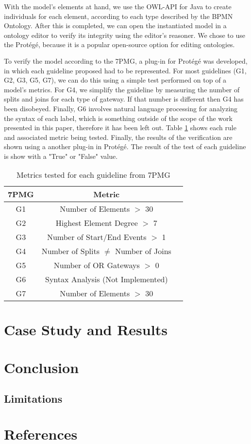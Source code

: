 \documentclass{llncs}
\begin{document}
With the model's elements at hand, we use the OWL-API for Java to create individuals for each element, according to each type described by the BPMN Ontology. After this is completed, we can open the instantiated model in a ontology editor to verify its integrity using the editor's reasoner. We chose to use the Protégé, because it is a popular open-source option for editing ontologies.




To verify the model according to the 7PMG, a plug-in for Protégé was developed, in which each guideline proposed had to be represented. For most guidelines (G1, G2, G3, G5, G7), we can do this using a simple test performed on top of a model's metrics. For G4, we simplify the guideline by measuring the number of splits and joins for each type of gateway. If that number is different then G4 has been disobeyed. Finally, G6 involves natural language processing for analyzing the syntax of each label, which is something outside of the scope of the work presented in this paper, therefore it has been left out. Table \ref{Metrics} shows each rule and associated metric being tested. Finally, the results of the verification are shown using a another plug-in in Protégé. The result of the test of each guideline is show with a "True" or "False" value.

\begin{table}[h]
	\label{Metrics}
	\caption{Metrics tested for each guideline from 7PMG}
	\centering
	\begin{tabular}{ccc}
		\hline
		7PMG 	& Metric 									\\
		\hline
		G1 		& Number of Elements $>$ 30 				\\
		G2 		& Highest Element Degree $>$ 7				\\  
		G3 		& Number of Start/End Events $>$ 1			\\
		G4 		& Number of Splits $\neq$ Number of Joins 	\\ 
		G5 		& Number of OR Gateways $>$ 0				\\
		G6 		& Syntax Analysis (Not Implemented) 		\\
		G7		& Number of Elements $>$ 30 				\\
		\hline
	\end{tabular} 
\end{table}



\section{Case Study and Results}\label{CaseStudy}
\section{Conclusion}\label{Conclusion}
\subsection{Limitations}



\section{References}\label{References}



\end{document}
